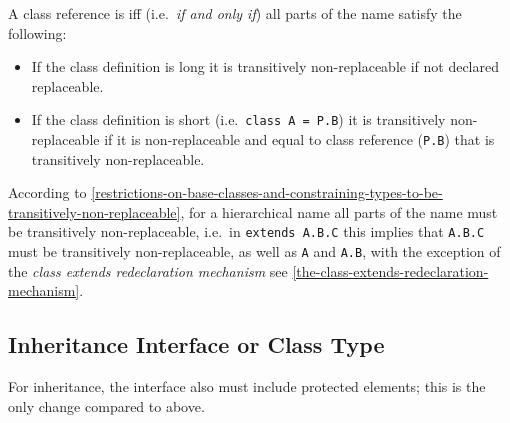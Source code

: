 A class reference is  iff (i.e.\ \emph{if and only if}) all parts of the name satisfy the following:
\begin{itemize}
\item
  If the class definition is long it is transitively non-replaceable if
  not declared replaceable.
\item
  If the class definition is short (i.e.\ \lstinline!class A = P.B!) it is
  transitively non-replaceable if it is non-replaceable and equal to
  class reference (\lstinline!P.B!) that is transitively non-replaceable.
\end{itemize}

\begin{nonnormative}
According to \cref{restrictions-on-base-classes-and-constraining-types-to-be-transitively-non-replaceable}, for a hierarchical name all parts of the name must be transitively non-replaceable, i.e.\ in \lstinline!extends A.B.C! this implies that \lstinline!A.B.C! must be transitively non-replaceable, as well as \lstinline!A! and \lstinline!A.B!, with the exception of the \emph{class extends redeclaration mechanism} see \cref{the-class-extends-redeclaration-mechanism}.
\end{nonnormative}

\subsection{Inheritance Interface or Class Type}\label{inheritance-interface-or-class-type}

For inheritance, the interface also must include protected elements; this is the only change compared to above.

